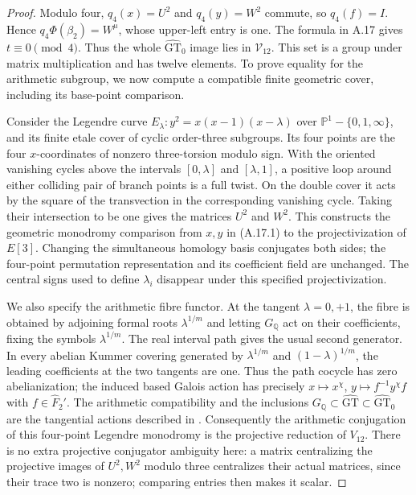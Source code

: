 \begin{proof}
Modulo four, $q_4(x)=U^2$ and $q_4(y)=W^2$ commute, so
$q_4(f)=I$. Hence $q_4\Phi(\beta_2)=W^\mu$, whose upper-left
entry is one. The formula in A.17 gives $t\equiv0\pmod4$.
Thus the whole $\widehat{\mathrm{GT}}_0$ image lies in
$\mathcal V_{12}$. This set is a group under matrix multiplication
and has twelve elements. To prove equality for the arithmetic
subgroup, we now compute a compatible finite geometric cover,
including its base-point comparison.

Consider the Legendre curve
$E_\lambda:y^2=x(x-1)(x-\lambda)$ over
$\mathbb P^1-\{0,1,\infty\}$, and its finite etale cover of
cyclic order-three subgroups. Its four points are the four
$x$-coordinates of nonzero three-torsion modulo sign. With the
oriented vanishing cycles above the intervals $[0,\lambda]$ and
$[\lambda,1]$, a positive loop around either colliding pair of
branch points is a full twist. On the double cover it acts by the
square of the transvection in the corresponding vanishing cycle.
Taking their intersection to be one gives the matrices
$U^2$ and $W^2$. This constructs the geometric monodromy comparison
from $x,y$ in (A.17.1) to the projectivization of $E[3]$.
Changing the simultaneous homology basis conjugates both sides;
the four-point permutation representation and its coefficient
field are unchanged. The central signs used to define $\lambda_i$
disappear under this specified projectivization.

We also specify the arithmetic fibre functor. At the tangent
$\lambda=0,+1$, the fibre is obtained by adjoining formal roots
$\lambda^{1/m}$ and letting $G_{\mathbb Q}$ act on their coefficients,
fixing the symbols $\lambda^{1/m}$. The real interval path gives the
usual second generator. In every abelian Kummer covering generated
by $\lambda^{1/m}$ and $(1-\lambda)^{1/m}$, the leading coefficients
at the two tangents are one. Thus the path cocycle has zero
abelianization; the induced based Galois action has precisely
$x\mapsto x^\chi$, $y\mapsto f^{-1}y^\chi f$ with $f\in\widehat F_2'$.
The arithmetic compatibility and the inclusions
$G_{\mathbb Q}\subset\widehat{\mathrm{GT}}\subset
\widehat{\mathrm{GT}}_0$ are the tangential actions described in
\cite[\S0.3 and \S1.2--1.3]{A_HarbaterSchneps}.
Consequently the arithmetic conjugation of this four-point
Legendre monodromy is the projective reduction of $V_{12}$.
There is no extra projective conjugator ambiguity here: a matrix
centralizing the projective images of $U^2,W^2$ modulo three
centralizes their actual matrices, since their trace two is
nonzero; comparing entries then makes it scalar.


\end{proof}
